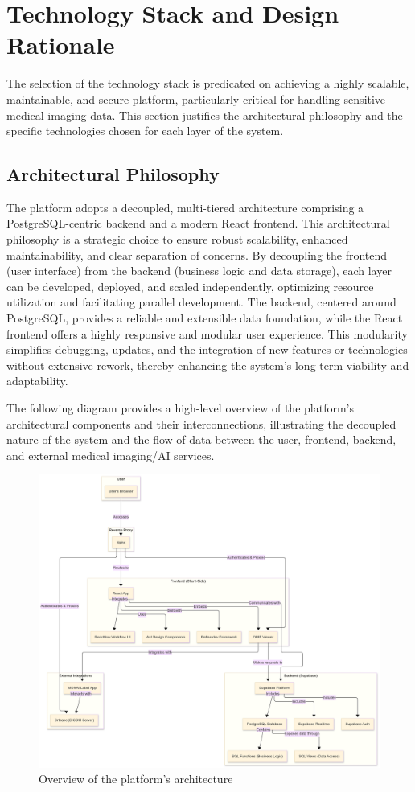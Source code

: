 \section{Technology Stack and Design Rationale}
The selection of the technology stack is predicated on achieving a highly scalable, maintainable, and secure platform, particularly critical for handling sensitive medical imaging data. This section justifies the architectural philosophy and the specific technologies chosen for each layer of the system.

\subsection{Architectural Philosophy}
The platform adopts a decoupled, multi-tiered architecture comprising a PostgreSQL-centric backend and a modern React frontend. This architectural philosophy is a strategic choice to ensure robust scalability, enhanced maintainability, and clear separation of concerns. By decoupling the frontend (user interface) from the backend (business logic and data storage), each layer can be developed, deployed, and scaled independently, optimizing resource utilization and facilitating parallel development. The backend, centered around PostgreSQL, provides a reliable and extensible data foundation, while the React frontend offers a highly responsive and modular user experience. This modularity simplifies debugging, updates, and the integration of new features or technologies without extensive rework, thereby enhancing the system's long-term viability and adaptability.

The following diagram provides a high-level overview of the platform's architectural components and their interconnections, illustrating the decoupled nature of the system and the flow of data between the user, frontend, backend, and external medical imaging/AI services.

\begin{figure}
    \centering
    \includegraphics[width=1\linewidth]{content//resources//architecture.png}
    \caption{Overview of the platform's architecture}
    \label{fig:enter-label}
\end{figure}

